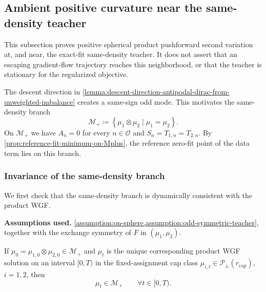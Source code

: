 
\subsection{Ambient positive curvature near the same-density teacher}
\label{subsec:post-escape-convexity-on-the-same-density}

This subsection proves positive spherical product pushforward second variation
at, and near, the exact-fit same-density teacher.  It does not assert that an
escaping gradient-flow trajectory reaches this neighborhood, or that the
teacher is stationary for the regularized objective.

The descent direction in \cref{lemma:descent-direction-antipodal-dirac-from-unweighted-imbalance} creates a same-sign odd mode. This motivates the same-density branch
\begin{equation}
    \mathcal M_+
    \coloneq
    \left\{
        \mu_1\otimes \mu_2
        \mid
        \mu_1=\mu_2
    \right\}.
\end{equation}
On $\mathcal M_+$ we have $A_n=0$ for every $n\in \mathcal O$ and $S_n=T_{1,n}=T_{2,n}$. By \cref{prop:reference-fit-minimum-on-Mplus}, the reference zero-fit point of the data term lies on this branch.

\subsubsection{Invariance of the same-density branch}

We first check that the same-density branch is dynamically consistent with the product WGF.
\begin{proposition}
\label{lem:invariance-same-density-branch}
\textbf{Assumptions used.} \cref{assumption:on-sphere,assumption:odd-symmetric-teacher}, together with the exchange symmetry of $F$ in $(\mu_1,\mu_2)$.

If \(\mu_0=\mu_{1,0}\otimes \mu_{2,0}\in \mathcal M_+\) and \(\mu_t\) is the
unique corresponding product WGF solution on an interval \([0,T)\) in the
fixed-assignment cap class \(\mu_{i,t}\in\mathcal P_\pm(r_{\mathrm{cap}})\), \(i=1,2\), then
\begin{equation}
    \mu_t\in \mathcal M_+
    \qquad
    \forall t\in[0,T).
\end{equation}
\end{proposition}

